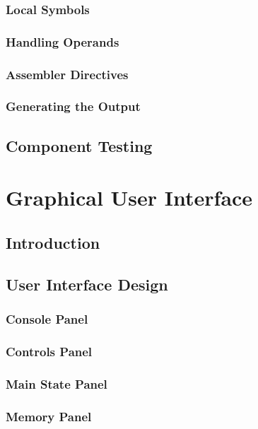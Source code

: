 \documentclass[a4paper,11pt]{report}
\begin{document}
\subsection{Local Symbols}
\subsection{Handling Operands}
\subsection{Assembler Directives}
\subsection{Generating the Output}
\section{Component Testing}
\chapter{Graphical User Interface}
\section{Introduction}
\section{User Interface Design}
\subsection{Console Panel}
\subsection{Controls Panel}
\subsection{Main State Panel}
\subsection{Memory Panel}
\end{document}

